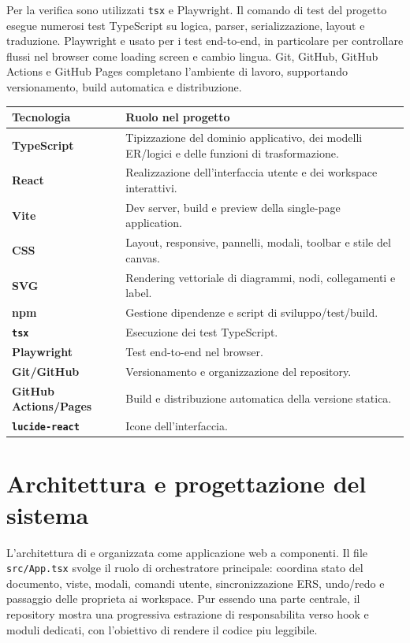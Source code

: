 Per la verifica sono utilizzati \texttt{tsx} e Playwright. Il comando di test del progetto esegue numerosi test TypeScript su logica, parser, serializzazione, layout e traduzione. Playwright e usato per i test end-to-end, in particolare per controllare flussi nel browser come loading screen e cambio lingua. Git, GitHub, GitHub Actions e GitHub Pages completano l'ambiente di lavoro, supportando versionamento, build automatica e distribuzione.

\noindent\begin{tabularx}{\textwidth}{>{\bfseries}p{3.5cm}X}
Tecnologia & Ruolo nel progetto \\
\hline
TypeScript & Tipizzazione del dominio applicativo, dei modelli ER/logici e delle funzioni di trasformazione. \\
React & Realizzazione dell'interfaccia utente e dei workspace interattivi. \\
Vite & Dev server, build e preview della single-page application. \\
CSS & Layout, responsive, pannelli, modali, toolbar e stile del canvas. \\
SVG & Rendering vettoriale di diagrammi, nodi, collegamenti e label. \\
npm & Gestione dipendenze e script di sviluppo/test/build. \\
\texttt{tsx} & Esecuzione dei test TypeScript. \\
Playwright & Test end-to-end nel browser. \\
Git/GitHub & Versionamento e organizzazione del repository. \\
GitHub Actions/Pages & Build e distribuzione automatica della versione statica. \\
\texttt{lucide-react} & Icone dell'interfaccia. \\
\end{tabularx}

\section{Architettura e progettazione del sistema}

L'architettura di \builder{} e organizzata come applicazione web a componenti. Il file \texttt{src/App.tsx} svolge il ruolo di orchestratore principale: coordina stato del documento, viste, modali, comandi utente, sincronizzazione ERS, undo/redo e passaggio delle proprieta ai workspace. Pur essendo una parte centrale, il repository mostra una progressiva estrazione di responsabilita verso hook e moduli dedicati, con l'obiettivo di rendere il codice piu leggibile.

